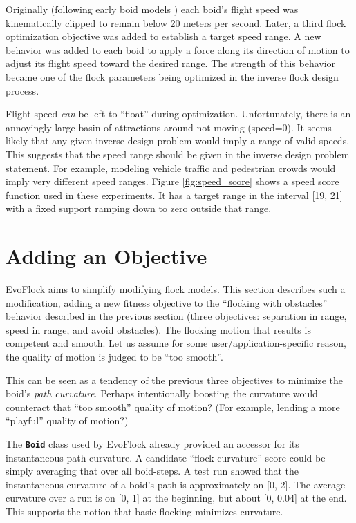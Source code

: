 \documentclass[letterpaper]{article}
\newcommand{\code}[1]{\textbf{\small \texttt{#1}}}
\begin{document}
Originally (following early boid models \citep{reynolds_flocks_1987}) each boid's flight speed was kinematically clipped to remain below 20 meters per second. Later, a third flock optimization objective was added to establish a target speed range. A new behavior was added to each boid to apply a force along its direction of motion to adjust its flight speed toward the desired range. The strength of this behavior became one of the flock parameters being optimized in the inverse flock design process.

Flight speed \textit{can} be left to ``float'' during optimization. Unfortunately, there is an annoyingly large basin of attractions around not moving (speed=0). It seems likely that any given inverse design problem would imply a range of valid speeds. This suggests that the speed range should be given in the inverse design problem statement. For example, modeling vehicle traffic and pedestrian crowds would imply very different speed ranges. Figure \ref{fig:speed_score} shows a speed score function used in these experiments. It has a target range in the interval [19, 21] with a fixed support ramping down to zero outside that range.

\section{Adding an Objective}
\label{sec:add_objective}

EvoFlock aims to simplify modifying flock models. This section describes such a modification, adding a new fitness objective to the ``flocking with obstacles'' behavior described in the previous section (three objectives: separation in range, speed in range, and avoid obstacles). The flocking motion that results is competent and smooth. Let us assume for some user/application-specific reason, the quality of motion is judged to be ``too smooth''. 

This can be seen as a tendency of the previous three objectives to minimize the boid's \textit{path curvature}. Perhaps intentionally boosting the curvature would counteract that ``too smooth'' quality of motion? (For example, lending a more ``playful'' quality of motion?)

The \code{Boid} class used by EvoFlock already provided an accessor for its instantaneous path curvature. A candidate ``flock curvature'' score could be simply averaging that over all boid-steps. A test run showed that the instantaneous curvature of a boid's path is approximately on [0, 2]. The average curvature over a run is on [0, 1] at the beginning, but about [0, 0.04] at the end. This supports the notion that basic flocking minimizes curvature.
\end{document}
